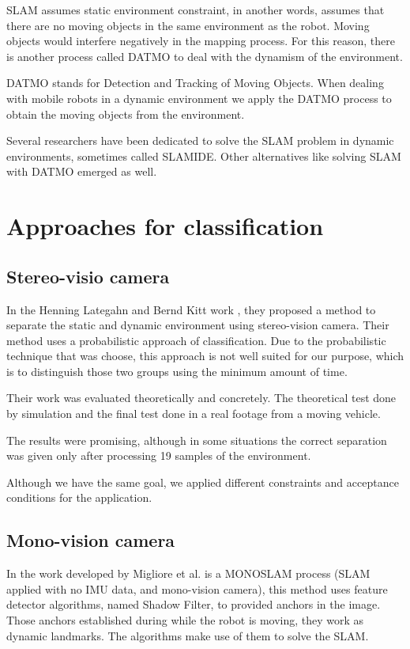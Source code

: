 SLAM assumes static environment constraint, in another words, assumes that there are no moving objects in the same environment as the robot. Moving objects would interfere negatively in the mapping process. For this reason, there is another process called DATMO to deal with the dynamism of the environment.

DATMO stands for Detection and Tracking of Moving Objects. When dealing with mobile robots in a dynamic environment we apply the DATMO process to obtain the moving objects from the environment.

Several researchers have been dedicated to solve the SLAM problem in dynamic environments, sometimes called SLAMIDE\cite{bibbyrss07}. Other alternatives like solving SLAM with DATMO\cite{Wang02simultaneouslocalization} emerged as well.

\section{Approaches for classification}

\subsection{Stereo-visio camera}

In the Henning Lategahn and Bernd Kitt work \cite{DBLP:conf/ivs/LategahnGHKE11}, they proposed a method to separate the static and dynamic environment using stereo-vision camera. Their method uses a probabilistic approach of classification. Due to the probabilistic technique that was choose, this approach is not well suited for our purpose, which is to distinguish those two groups using the minimum amount of time.

Their work was evaluated theoretically and concretely. The theoretical test done by simulation and the final test done in a real footage from a moving vehicle.

The results were promising, although in some situations the correct separation was given only after processing 19 samples of the environment. 

Although we have the same goal, we applied different constraints and acceptance conditions for the application. 

\subsection{Mono-vision camera}

In the work developed by Migliore et al. \cite{Migliore_2009_ICRA} is a MONOSLAM process (SLAM applied with no IMU data, and mono-vision camera), this method uses feature detector algorithms, named Shadow Filter, to provided anchors in the image. Those anchors established during while the robot is moving, they work as dynamic landmarks. The algorithms make use of them to solve the SLAM.

